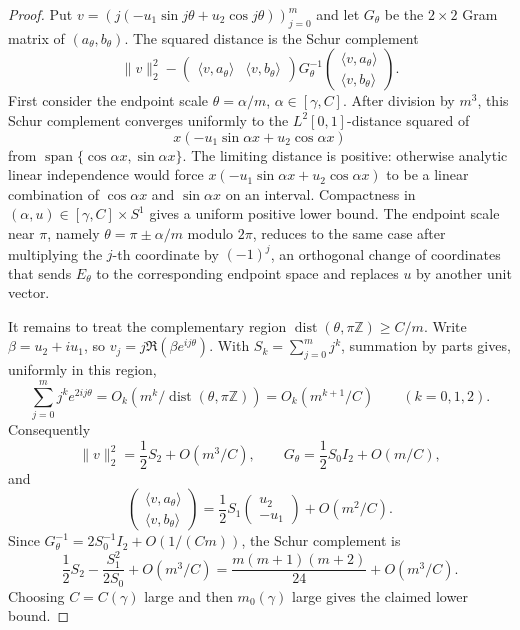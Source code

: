 \documentclass[11pt]{amsart}
\numberwithin{equation}{section}
\theoremstyle{definition}
\theoremstyle{remark}
\newcommand{\dist}{\operatorname{dist}}
\begin{document}
\begin{proof}
Put \(v=(j(-u_1\sin j\theta+u_2\cos j\theta))_{j=0}^m\) and let
\(G_\theta\) be the \(2\times2\) Gram matrix of \((a_\theta,b_\theta)\).
The squared distance is the Schur complement
\[
  \|v\|_2^2
  -
  \begin{pmatrix}\langle v,a_\theta\rangle&\langle v,b_\theta\rangle\end{pmatrix}
  G_\theta^{-1}
  \begin{pmatrix}\langle v,a_\theta\rangle\\ \langle v,b_\theta\rangle\end{pmatrix}.
\]
First consider the endpoint scale \(\theta=\alpha/m\), \(\alpha\in[\gamma,C]\).
After division by \(m^3\), this Schur complement converges uniformly to the
\(L^2[0,1]\)-distance squared of
\[
  x(-u_1\sin \alpha x+u_2\cos \alpha x)
\]
from \(\operatorname{span}\{\cos\alpha x,\sin\alpha x\}\).  The limiting
distance is positive: otherwise analytic linear independence would force
\(x(-u_1\sin\alpha x+u_2\cos\alpha x)\) to be a linear combination of
\(\cos\alpha x\) and \(\sin\alpha x\) on an interval.  Compactness in
\((\alpha,u)\in[\gamma,C]\times S^1\) gives a uniform positive lower bound.
The endpoint scale near \(\pi\), namely \(\theta=\pi\pm\alpha/m\) modulo
\(2\pi\), reduces to the same case after multiplying the \(j\)-th coordinate by
\((-1)^j\), an orthogonal change of coordinates that sends \(E_\theta\) to the
corresponding endpoint space and replaces \(u\) by another unit vector.

It remains to treat the complementary region \(\dist(\theta,\pi\mathbb Z)\ge
C/m\).  Write \(\beta=u_2+i u_1\), so \(v_j=j\Re(\beta e^{ij\theta})\).  With
\(S_k=\sum_{j=0}^m j^k\), summation by parts gives, uniformly in this region,
\[
  \sum_{j=0}^m j^k e^{2ij\theta}=O_k(m^k/\dist(\theta,\pi\mathbb Z))
  =O_k(m^{k+1}/C)\qquad(k=0,1,2).
\]
Consequently
\[
  \|v\|_2^2=\frac12 S_2+O(m^3/C),\qquad
  G_\theta=\frac12 S_0 I_2+O(m/C),
\]
and
\[
  \begin{pmatrix}\langle v,a_\theta\rangle\\ \langle v,b_\theta\rangle\end{pmatrix}
  =
  \frac12 S_1\begin{pmatrix}u_2\\ -u_1\end{pmatrix}
  +O(m^2/C).
\]
Since \(G_\theta^{-1}=2S_0^{-1}I_2+O(1/(Cm))\), the Schur complement is
\[
  \frac12S_2-\frac{S_1^2}{2S_0}+O(m^3/C)
  =
  \frac{m(m+1)(m+2)}{24}+O(m^3/C).
\]
Choosing \(C=C(\gamma)\) large and then \(m_0(\gamma)\) large gives the claimed
lower bound.
\end{proof}
\end{document}
